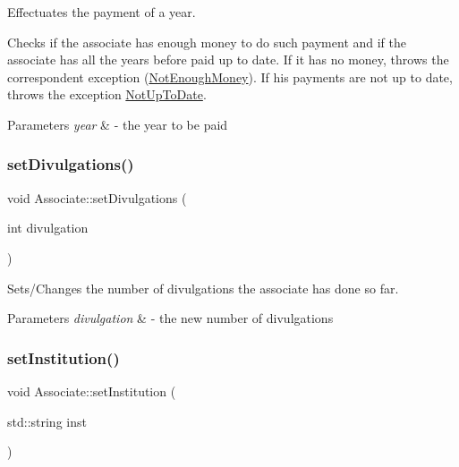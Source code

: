 Effectuates the payment of a year. 

Checks if the associate has enough money to do such payment and if the associate has all the years before paid up to date. If it has no money, throws the correspondent exception (\mbox{\hyperlink{classNotEnoughMoney}{Not\+Enough\+Money}}). If his payments are not up to date, throws the exception \mbox{\hyperlink{classNotUpToDate}{Not\+Up\+To\+Date}}.


\begin{DoxyParams}{Parameters}
{\em year} & -\/ the year to be paid \\
\hline
\end{DoxyParams}
\mbox{\label{classAssociate_a7c9f1c593da26eedc3a4f56302f67bec}} 
\subsubsection{\texorpdfstring{set\+Divulgations()}{setDivulgations()}}
{\footnotesize\ttfamily void Associate\+::set\+Divulgations (\begin{DoxyParamCaption}\item[{int}]{divulgation }\end{DoxyParamCaption})}



Sets/\+Changes the number of divulgations the associate has done so far. 


\begin{DoxyParams}{Parameters}
{\em divulgation} & -\/ the new number of divulgations \\
\hline
\end{DoxyParams}
\mbox{\label{classAssociate_aa441347cdbef813e4603d2c67e0822fb}} 
\subsubsection{\texorpdfstring{set\+Institution()}{setInstitution()}}
{\footnotesize\ttfamily void Associate\+::set\+Institution (\begin{DoxyParamCaption}\item[{std\+::string}]{inst }\end{DoxyParamCaption})}



